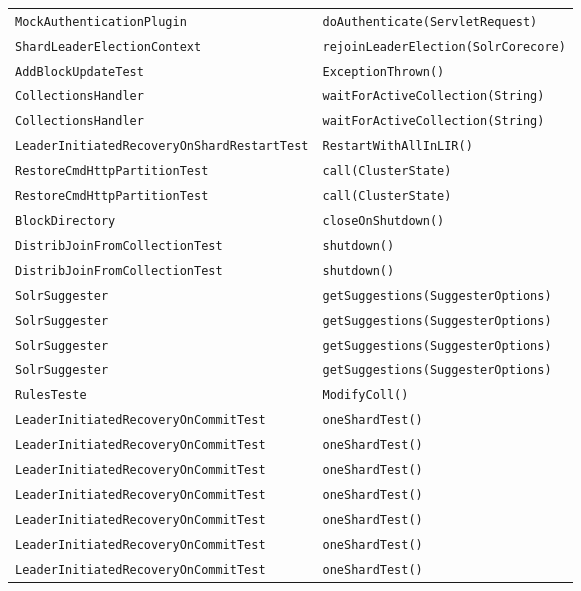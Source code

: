 \begin{center}
\begin{longtable}{ll}
\lstinline/MockAuthenticationPlugin/&{\lstinline/doAuthenticate(ServletRequest)/}\\
\lstinline/ShardLeaderElectionContext/&{\lstinline/rejoinLeaderElection(SolrCorecore)/}\\
\lstinline/AddBlockUpdateTest/&{\lstinline/ExceptionThrown()/}\\
\lstinline/CollectionsHandler/&{\lstinline/waitForActiveCollection(String)/}\\
\lstinline/CollectionsHandler/&{\lstinline/waitForActiveCollection(String)/}\\
\lstinline/LeaderInitiatedRecoveryOnShardRestartTest/&{\lstinline/RestartWithAllInLIR()/}\\
\lstinline/RestoreCmdHttpPartitionTest/&{\lstinline/call(ClusterState)/}\\
\lstinline/RestoreCmdHttpPartitionTest/&{\lstinline/call(ClusterState)/}\\
\lstinline/BlockDirectory/&{\lstinline/closeOnShutdown()/}\\
\lstinline/DistribJoinFromCollectionTest/&{\lstinline/shutdown()/}\\
\lstinline/DistribJoinFromCollectionTest/&{\lstinline/shutdown()/}\\
\lstinline/SolrSuggester/&{\lstinline/getSuggestions(SuggesterOptions)/}\\
\lstinline/SolrSuggester/&{\lstinline/getSuggestions(SuggesterOptions)/}\\
\lstinline/SolrSuggester/&{\lstinline/getSuggestions(SuggesterOptions)/}\\
\lstinline/SolrSuggester/&{\lstinline/getSuggestions(SuggesterOptions)/}\\
\lstinline/RulesTeste/&{\lstinline/ModifyColl()/}\\
\lstinline/LeaderInitiatedRecoveryOnCommitTest/&{\lstinline/oneShardTest()/}\\
\lstinline/LeaderInitiatedRecoveryOnCommitTest/&{\lstinline/oneShardTest()/}\\
\lstinline/LeaderInitiatedRecoveryOnCommitTest/&{\lstinline/oneShardTest()/}\\
\lstinline/LeaderInitiatedRecoveryOnCommitTest/&{\lstinline/oneShardTest()/}\\
\lstinline/LeaderInitiatedRecoveryOnCommitTest/&{\lstinline/oneShardTest()/}\\
\lstinline/LeaderInitiatedRecoveryOnCommitTest/&{\lstinline/oneShardTest()/}\\
\lstinline/LeaderInitiatedRecoveryOnCommitTest/&{\lstinline/oneShardTest()/}\\

\end{longtable}
\end{center}
